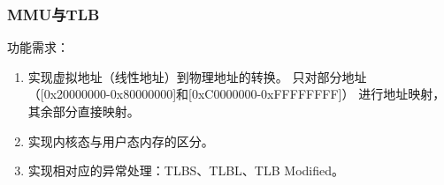         \subsubsection{MMU与TLB}
            功能需求：
            \begin{enumerate}
            \item
                实现虚拟地址（线性地址）到物理地址的转换。%
                只对部分地址%
                （[0x20000000-0x80000000]和[0xC0000000-0xFFFFFFFF]）%
                进行地址映射，其余部分直接映射。
            \item
                实现内核态与用户态内存的区分。
            \item
                实现相对应的异常处理：TLBS、TLBL、TLB Modified。
            \end{enumerate}


